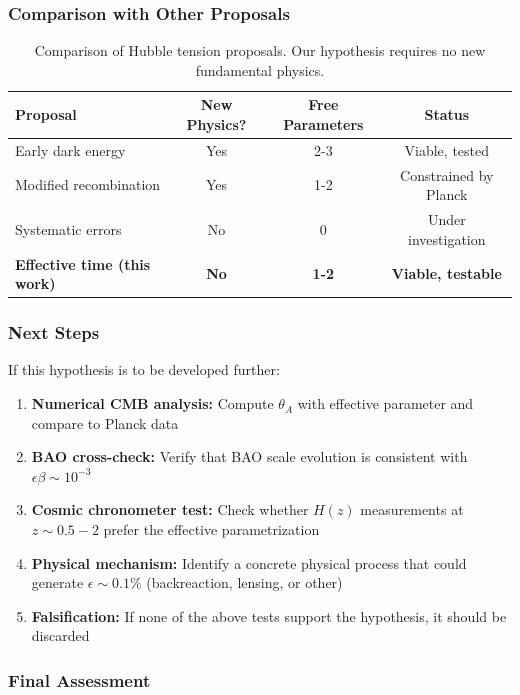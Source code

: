 \subsubsection{Comparison with Other Proposals}

\begin{table}[h]
\centering
\small
\begin{tabular}{lccc}
\hline
\textbf{Proposal} & \textbf{New Physics?} & \textbf{Free Parameters} & \textbf{Status} \\
\hline
Early dark energy & Yes & 2-3 & Viable, tested \\
Modified recombination & Yes & 1-2 & Constrained by Planck \\
Systematic errors & No & 0 & Under investigation \\
\textbf{Effective time (this work)} & \textbf{No} & \textbf{1-2} & \textbf{Viable, testable} \\
\hline
\end{tabular}
\caption{Comparison of Hubble tension proposals. Our hypothesis requires no new fundamental physics.}
\label{tab:comparison}
\end{table}

\subsubsection{Next Steps}

If this hypothesis is to be developed further:
\begin{enumerate}
    \item \textbf{Numerical CMB analysis:} Compute $\theta_A$ with effective parameter and compare to Planck data
    \item \textbf{BAO cross-check:} Verify that BAO scale evolution is consistent with $\epsilon \beta \sim 10^{-3}$
    \item \textbf{Cosmic chronometer test:} Check whether $H(z)$ measurements at $z \sim 0.5-2$ prefer the effective parametrization
    \item \textbf{Physical mechanism:} Identify a concrete physical process that could generate $\epsilon \sim 0.1\%$ (backreaction, lensing, or other)
    \item \textbf{Falsification:} If none of the above tests support the hypothesis, it should be discarded
\end{enumerate}

\subsubsection{Final Assessment}

